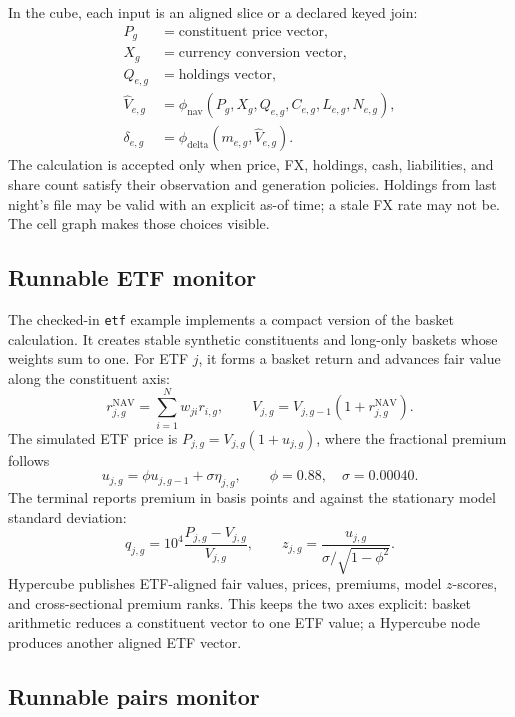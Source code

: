 \documentclass{strategynet-journal}
\begin{document}
In the cube, each input is an aligned slice or a declared keyed join:
\begin{align*}
  P_g &= \text{constituent price vector},\\
  X_g &= \text{currency conversion vector},\\
  Q_{e,g} &= \text{holdings vector},\\
  \widehat V_{e,g} &=
    \phi_{\mathrm{nav}}(P_g,X_g,Q_{e,g},C_{e,g},L_{e,g},N_{e,g}),\\
  \delta_{e,g} &= \phi_{\mathrm{delta}}(m_{e,g},\widehat V_{e,g}).
\end{align*}
The calculation is accepted only when price, FX, holdings, cash, liabilities,
and share count satisfy their observation and generation policies.  Holdings
from last night's file may be valid with an explicit as-of time; a stale FX
rate may not be.  The cell graph makes those choices visible.

\subsection{Runnable ETF monitor}

The checked-in \texttt{etf} example implements a compact version of the basket
calculation.  It creates stable synthetic constituents and long-only baskets
whose weights sum to one.  For ETF \(j\), it forms a basket return and advances
fair value along the constituent axis:
\[
  r^{\mathrm{NAV}}_{j,g}=\sum_{i=1}^{N} w_{ji}r_{i,g},
  \qquad
  V_{j,g}=V_{j,g-1}(1+r^{\mathrm{NAV}}_{j,g}).
\]
The simulated ETF price is \(P_{j,g}=V_{j,g}(1+u_{j,g})\), where the fractional
premium follows
\[
  u_{j,g}=\phi u_{j,g-1}+\sigma\eta_{j,g},
  \qquad \phi=0.88,\quad \sigma=0.00040.
\]
The terminal reports premium in basis points and against the stationary model
standard deviation:
\[
  q_{j,g}=10^4\frac{P_{j,g}-V_{j,g}}{V_{j,g}},
  \qquad
  z_{j,g}=\frac{u_{j,g}}{\sigma/\sqrt{1-\phi^2}}.
\]
Hypercube publishes ETF-aligned fair values, prices, premiums, model
\(z\)-scores, and cross-sectional premium ranks.  This keeps the two axes
explicit: basket arithmetic reduces a constituent vector to one ETF value; a
Hypercube node produces another aligned ETF vector.

\subsection{Runnable pairs monitor}
\end{document}
